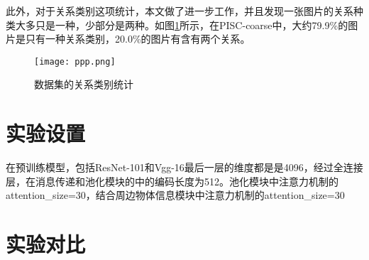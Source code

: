 此外，对于关系类别这项统计，本文做了进一步工作，并且发现一张图片的关系种类大多只是一种，少部分是两种。如图\ref{fig:exp-statistic}所示，在PISC-coarse中，大约79.9\%的图片是只有一种关系类别，20.0\%的图片有含有两个关系。

\begin{figure}[htpb]
	\centering
	\texttt{[image: ppp.png]}
    \caption{数据集的关系类别统计}
	\vspace*{-3.5mm}
	\label{fig:exp-statistic}
\end{figure}

\section{实验设置}

在预训练模型，包括ResNet-101和Vgg-16最后一层的维度都是是4096，经过全连接层，在消息传递和池化模块的中的编码长度为512。池化模块中注意力机制的attention_size=30，结合周边物体信息模块中注意力机制的attention_size=30


\section{实验对比}


